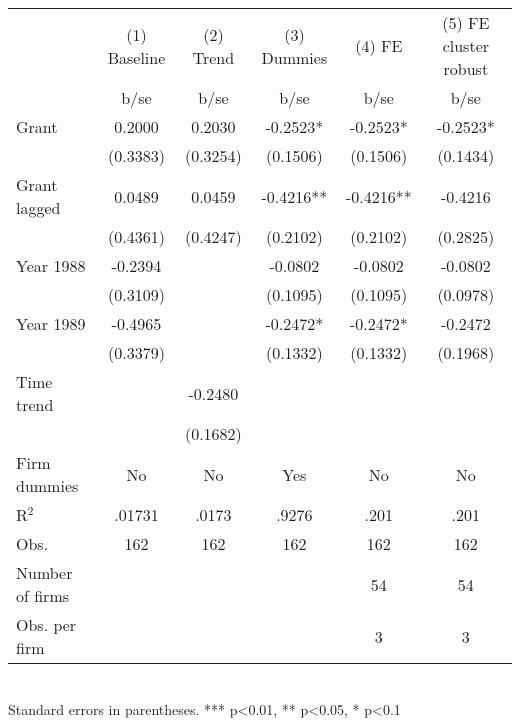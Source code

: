 \begin{tabular}{lccccc}\hline
                    &(1) Baseline   &   (2) Trend   & (3) Dummies   &      (4) FE   &(5) FE cluster robust   \\
                    &        b/se   &        b/se   &        b/se   &        b/se   &        b/se   \\
\hline
Grant               &      0.2000   &      0.2030   &     -0.2523*  &     -0.2523*  &     -0.2523*  \\
                    &    (0.3383)   &    (0.3254)   &    (0.1506)   &    (0.1506)   &    (0.1434)   \\
Grant lagged        &      0.0489   &      0.0459   &     -0.4216** &     -0.4216** &     -0.4216   \\
                    &    (0.4361)   &    (0.4247)   &    (0.2102)   &    (0.2102)   &    (0.2825)   \\
Year 1988           &     -0.2394   &               &     -0.0802   &     -0.0802   &     -0.0802   \\
                    &    (0.3109)   &               &    (0.1095)   &    (0.1095)   &    (0.0978)   \\
Year 1989           &     -0.4965   &               &     -0.2472*  &     -0.2472*  &     -0.2472   \\
                    &    (0.3379)   &               &    (0.1332)   &    (0.1332)   &    (0.1968)   \\
Time trend          &               &     -0.2480   &               &               &               \\
                    &               &    (0.1682)   &               &               &               \\
Firm dummies        &          No   &          No   &         Yes   &          No   &          No   \\
\hline
R$^2$               &      .01731   &       .0173   &       .9276   &        .201   &        .201   \\
Obs.                &         162   &         162   &         162   &         162   &         162   \\
Number of firms     &               &               &               &          54   &          54   \\
Obs. per firm       &               &               &               &           3   &           3   \\
\hline\end{tabular}\\Standard errors in parentheses. *** p<0.01, ** p<0.05, * p<0.1
